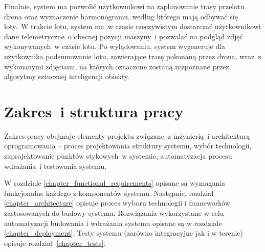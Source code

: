 Finalnie, system ma pozwolić użytkownikowi na zaplanowanie trasy przelotu drona
oraz wyznaczenie harmonogramu, według którego mają odbywać się loty.~W trakcie 
lotu, system ma~w czasie rzeczywistym dostarczać użytkownikowi dane telemetryczne~o
obecnej pozycji maszyny~i pozwalać na podgląd zdjęć wykonywanych~w czasie lotu.
Po wylądowaniu, system wygeneruje dla użytkownika podsumowanie lotu, zawierające
trasę pokonaną przez drona, wraz~z wykonanymi zdjęciami, na których oznaczone zostaną
rozpoznane przez algorytmy sztucznej inteligencji obiekty.

\section{Zakres~i struktura pracy} \label{intro_scope}

Zakres pracy obejmuje elementy projektu związane~z inżynierią~i architekturą
oprogramowania -- proces projektowania struktury systemu,
wybór technologii, zaprojektowanie punktów stykowych~w systemie, automatyzacja
procesu wdrażania~i testowania systemu.

W rozdziale \ref{chapter_functional_requirements} opisane są wymagania funkcjonalne
każdego z komponentów systemu. Następnie, rozdział \ref{chapter_architecture} opisuje
proces wyboru technologii i frameworków zastosowanych do budowy systemu. 
Rozwiązania wykorzystane w celu automatyzacji budowania i wdrażania systemu opisane
są w rozdziale \ref{chapter_deployment}. Testy systemu (zarówno integracyjne jak
i w terenie) opisuje rozdział~\ref{chapter_tests}.
